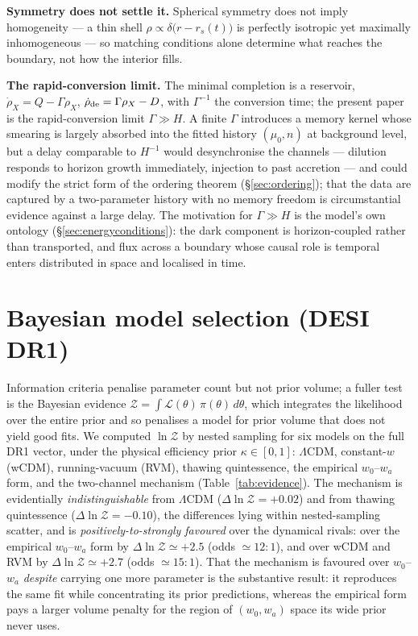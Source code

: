 \documentclass[11pt,a4paper]{article}
\newcommand{\lcdm}{\ensuremath{\Lambda}CDM}
\begin{document}
\textbf{Symmetry does not settle it.} Spherical symmetry does not imply homogeneity --- a thin shell $\rho\propto\delta\big(r-r_s(t)\big)$ is perfectly isotropic yet maximally inhomogeneous --- so matching conditions alone determine what reaches the boundary, not how the interior fills.

\textbf{The rapid-conversion limit.} The minimal completion is a reservoir, $\dot\rho_X = Q-\Gamma\rho_X$, $\dot\rho_{\rm de}=\Gamma\rho_X - D$, with $\Gamma^{-1}$ the conversion time; the present paper is the rapid-conversion limit $\Gamma\gg H$. A finite $\Gamma$ introduces a memory kernel whose smearing is largely absorbed into the fitted history $(\mu_0,n)$ at background level, but a delay comparable to $H^{-1}$ would desynchronise the channels --- dilution responds to horizon growth immediately, injection to past accretion --- and could modify the strict form of the ordering theorem (\S\ref{sec:ordering}); that the data are captured by a two-parameter history with no memory freedom is circumstantial evidence against a large delay. The motivation for $\Gamma\gg H$ is the model's own ontology (\S\ref{sec:energyconditions}): the dark component is horizon-coupled rather than transported, and flux across a boundary whose causal role is temporal enters distributed in space and localised in time.

\section{Bayesian model selection (DESI DR1)}\label{app:evidence}

Information criteria penalise parameter count but not prior volume; a fuller test is the Bayesian evidence $\mathcal{Z}=\int\mathcal{L}(\theta)\,\pi(\theta)\,d\theta$, which integrates the likelihood over the entire prior and so penalises a model for prior volume that does not yield good fits. We computed $\ln\mathcal{Z}$ by nested sampling \citep{Skilling2004,Speagle2020} for six models on the full DR1 vector, under the physical efficiency prior $\kappa\in[0,1]$: \lcdm{}, constant-$w$ (wCDM), running-vacuum (RVM), thawing quintessence, the empirical $w_0$--$w_a$ form, and the two-channel mechanism (Table~\ref{tab:evidence}). The mechanism is evidentially \emph{indistinguishable} from \lcdm{} ($\Delta\ln\mathcal{Z}=+0.02$) and from thawing quintessence ($\Delta\ln\mathcal{Z}=-0.10$), the differences lying within nested-sampling scatter, and is \emph{positively-to-strongly favoured} over the dynamical rivals: over the empirical $w_0$--$w_a$ form by $\Delta\ln\mathcal{Z}\simeq+2.5$ (odds $\simeq12:1$), and over wCDM and RVM by $\Delta\ln\mathcal{Z}\simeq+2.7$ (odds $\simeq15:1$). That the mechanism is favoured over $w_0$--$w_a$ \emph{despite} carrying one more parameter is the substantive result: it reproduces the same fit while concentrating its prior predictions, whereas the empirical form pays a larger volume penalty for the region of $(w_0,w_a)$ space its wide prior never uses.
\end{document}
